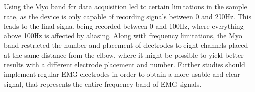 	Using the Myo band for data acquisition led to certain limitations in the sample rate, as the device is only capable of recording signals between 0 and 200Hz. This leads to the final signal being recorded between 0 and 100Hz, where everything above 100Hz is affected by aliasing. Along with frequency limitations, the Myo band restricted the number and placement of electrodes to eight channels placed at the same distance from the elbow, where it might be possible to yield better results with a different electrode placement and number. Further studies should implement regular EMG electrodes in order to obtain a more usable and clear signal, that represents the entire frequency band of EMG signals.
	
	

	


	
	
